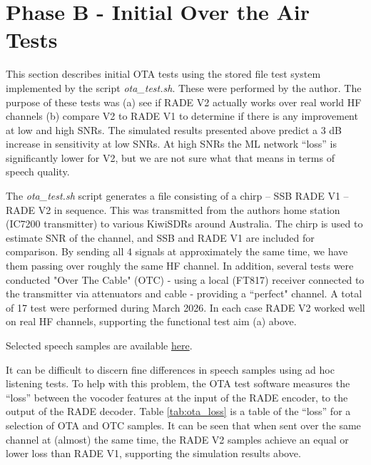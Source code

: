 \documentclass{article}
\begin{document}
\section{Phase B - Initial Over the Air Tests}

This section describes initial OTA tests using the stored file test system implemented by the script \emph{ota\_test.sh}.  These were performed by the author. The purpose of these tests was (a) see if RADE V2 actually works over real world HF channels (b) compare V2 to RADE V1 to determine if there is any improvement at low and high SNRs.  The simulated results presented above predict a 3 dB increase in sensitivity at low SNRs.  At high SNRs the ML network “loss” is significantly lower for V2, but we are not sure what that means in terms of speech quality.

The \emph{ota\_test.sh} script generates a file consisting of a chirp – SSB RADE V1 – RADE V2 in sequence. This was transmitted from the authors home station (IC7200 transmitter) to various KiwiSDRs around Australia.  The chirp is used to estimate SNR of the channel, and SSB and RADE V1 are included for comparison. By sending all 4 signals at approximately the same time, we have them passing over roughly the same HF channel. In addition, several tests were conducted "Over The Cable" (OTC) - using a local (FT817) receiver connected to the transmitter via attenuators and cable - providing a ``perfect" channel.  A total of 17 test were performed during March 2026. In each case RADE V2 worked well on real HF channels, supporting the functional test aim (a) above.

Selected speech samples are available \href{https://freedv.org/david-march-2026-ai-v1-c-port-qa-claude-code-v2-eoo-and-snr-stored-file-ota-tests/}{here}.

It can be difficult to discern fine differences in speech samples using ad hoc listening tests. To help with this problem, the OTA test software measures the “loss” between the vocoder features at the input of the RADE encoder, to the output of the RADE decoder.  Table \ref{tab:ota_loss} is a table of the “loss” for a selection of OTA and OTC samples. It can be seen that when sent over the same channel at (almost) the same time, the RADE V2 samples achieve an equal or lower loss than RADE V1, supporting the simulation results above.
\end{document}
